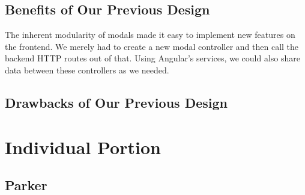 \documentclass[11pt]{article}   %
\begin{document}
\subsection{Benefits of Our Previous Design}

The inherent modularity of modals made it easy to implement new features on the frontend. We merely had to create a new modal controller and then call the backend HTTP routes out of that. Using Angular's services, we could also share data between these controllers as we needed.

\subsection{Drawbacks of Our Previous Design}

\section{Individual Portion}
\subsection*{Parker}
\end{document}
